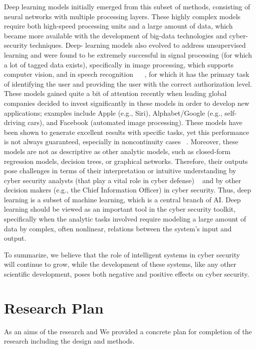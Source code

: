 Deep learning models initially emerged from this subset of methods, consisting of neural
networks with multiple processing layers. These highly complex models require both
high-speed processing units and a large amount of data, which became more available
with the development of big-data technologies and cyber-security techniques. Deep-
learning models also evolved to address unsupervised learning and were found to be
extremely successful in signal processing (for which a lot of tagged data exists), specifically in image processing, which supports computer vision, and in speech recognition
~\cite{HeZRS16} ~\cite{hinton2012deep}, for which it has the primary task of identifying the
user and providing the user with the correct authorization level. These models gained
quite a bit of attention recently when leading global companies decided to invest 
significantly in these models in order to develop new applications; examples include Apple
(e.g., Siri), Alphabet/Google (e.g., self-driving cars), and Facebook (automated image
processing). These models have been shown to generate excellent results with specific
tasks, yet this performance is not always guaranteed, especially in noncontinuity cases
~\cite{Schmidhuber15}. Moreover, these models are not as descriptive as other analytic
models, such as closed-form regression models, decision trees, or graphical networks.
Therefore, their outputs pose challenges in terms of their interpretation or intuitive
understanding by cyber security analysts (that play a vital role in cyber defense)
~\cite{GanesanJC17} and by other decision makers (e.g., the Chief Information Officer)
in cyber security. Thus, deep learning is a subset of machine learning, which is a central
branch of AI. Deep learning should be viewed as an important tool in the cyber security
toolkit, specifically when the analytic tasks involved require modeling a large amount
of data by complex, often nonlinear, relations between the system’s input and output.

      To summarize, we believe that the role of intelligent systems in cyber security will
continue to grow, while the development of these systems, like any other scientific
development, poses both negative and positive effects on cyber security.


\section{Research Plan}

 As an aims of the research and We provided a concrete plan for completion of the research including the design and methods. 

